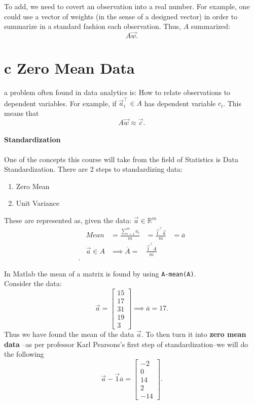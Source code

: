 \documentclass[12pt]{book}
\begin{document}
To add, we need to covert an observation into a real number. 
For example, one could use a vector of weights (in the sense of a designed vector) in order to
        summarize in a standard fashion each observation.
Thus, $A$ summarized:
\[
A\vec w
.\] 
        
\section*{c Zero Mean Data}
a problem often found in data analytics is: 
How to relate observations to dependent variables. For example, if $\vec a_i^\top \in A$ has dependent variable $c_i$. 
This means that
 \[
A\vec w \approx \vec c
.\] 

\paragraph{Standardization}
One of the concepts this course will take from the field of Statistics is Data Standardization. There are 2 steps to standardizing data:
\begin{enumerate}
        \item Zero Mean
        \item Unit Variance
\end{enumerate}

These are represented as, given the data: $\vec a\in \mathbb{R}^m$
 \begin{align*}
        &Mean &= \frac{\sum^m_{i=1}a_i}{m} &= \frac{\vec1^\top\vec a}{m} &=\overline{a}\\
        &  \vec a \in A&\implies\overline{A}=&\frac{\vec 1^\top A}{m} \\
 .\end{align*}

 In Matlab the mean of a matrix is found by using \texttt{A-mean(A)}.\\
 Consider the data:
 \[
 \vec a = \begin{bmatrix} 15\\17\\31\\19\\3 \end{bmatrix}\implies \overline{a} = 17 
 .\] 
Thus we have found the mean of the data $\vec a$.
To then turn it into \textbf{zero mean data} --as per professor Karl Pearsons's first step of standardization--we will do the following
\[
\vec a - \vec 1 \overline{a} = \begin{bmatrix} -2\\0\\14\\2\\-14 \end{bmatrix} 
.\] 
\end{document}
